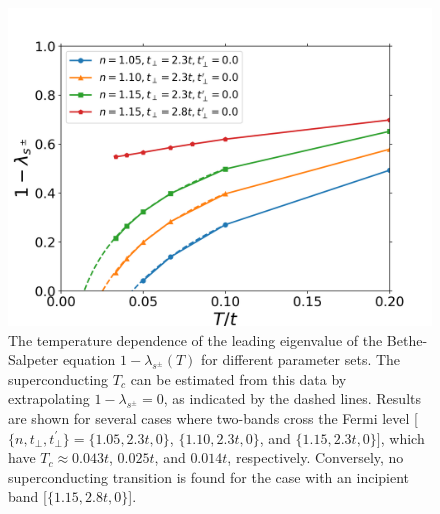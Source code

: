 \documentclass[prb,twocolumn,amsmath,amssymb,superscriptaddress,floatfix,nofootinbib]{revtex4-2}
\begin{document}
\begin{figure}[t]
\centering
\includegraphics[scale=0.4]{Temp_L0_varydensity.png}
\caption{The temperature dependence of the leading eigenvalue of the Bethe-Salpeter equation $1-\lambda_{s^\pm}(T)$ for different parameter sets. The superconducting $T_c$ can be estimated from this data by extrapolating $1-\lambda_{s^\pm} = 0$, as indicated by the dashed lines. Results are shown for several cases where two-bands cross the Fermi level [$\{ n, t^{\phantom\prime}_\perp, t_\perp^\prime \} = \{1.05, 2.3t, 0\}$, $\{1.10, 2.3t, 0\}$, and $\{1.15, 2.3t, 0\}]$, which have $T_c \approx 0.043t$, $0.025t$, and $0.014t$, respectively. Conversely, no superconducting transition is found for the case with an incipient band [$\{1.15, 2.8t, 0\}$].}
\label{fig:lambdabulkinc}
\end{figure}
\end{document}
